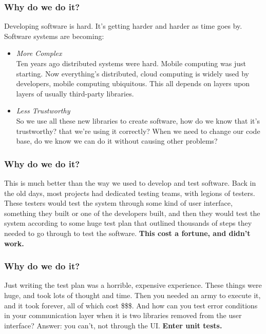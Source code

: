 \documentclass[t, 10pt]{beamer}
\begin{document}
\begin{frame}
\frametitle{Why do we do it?}
Developing software is hard.  It's getting harder and harder as time goes by.  Software systems are becoming:
\begin{itemize}
\item \textit{More Complex} \\
Ten years ago distributed systems were hard.  Mobile computing was just starting.  Now everything's distributed, cloud computing is widely used by developers, mobile computing ubiquitous.  This all depends on layers upon layers of usually third-party libraries.
\pause
\item \textit{Less Trustworthy} \\
So we use all these new libraries to create software, how do we know that it's trustworthy? that we're using it correctly? When we need to change our code base, do we know we can do it without causing other problems?
\end{itemize}

\end{frame}

\begin{frame}
\frametitle{Why do we do it?}
This is much better than the way we used to develop and test software.
\newline
\newline
\newline
\pause
Back in the old days, most projects had dedicated testing teams, with legions of testers.  These testers would test the system through some kind of user interface, something they built or one of the developers built, and then they would test the system according to some huge test plan that outlined thousands of steps they needed to go through to test the software.
\newline
\newline
\newline
\pause
\textbf{This cost a fortune, and didn't work.}
\end{frame}

\begin{frame}
\frametitle{Why do we do it?}
Just writing the test plan was a horrible, expensive experience.  These things were huge, and took lots of thought and time.  Then you needed an army to execute it, and it took forever, all of which cost \$\$\$.  And how can you test error conditions in your communication layer when it is two libraries removed from the user interface?
\newline
\newline
\newline
\pause
Answer: you can't, not through the UI.
\newline
\newline
\newline
\textbf{Enter unit tests.}
\end{frame}
\end{document}

